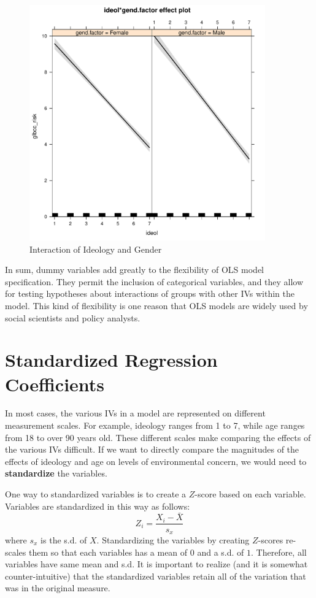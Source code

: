 \documentclass[11pt,openany]{book}\usepackage[]{graphicx}\usepackage[]{color}
\begin{document}
\begin{figure}
  \centering
  \includegraphics[width=4in]{14_Topics/dummales.pdf}%
  \caption {Interaction of Ideology and Gender \label{fig:dummales}}
\end{figure}


In sum, dummy variables add greatly to the flexibility of OLS model specification. They permit the inclusion of categorical variables, and they allow for testing hypotheses about interactions  of groups with other IVs within the model. This kind of flexibility is one reason that OLS models are widely used by social scientists and policy analysts.

\section{Standardized Regression Coefficients} 

In most cases, the various IVs in a model are represented on different measurement scales. For example, ideology ranges from 1 to 7, while age ranges from 18 to over 90 years old. These different scales make comparing the effects of the various IVs difficult.  If we want to directly compare the magnitudes of the effects of ideology and age on levels of environmental concern, we would need to \textbf{standardize} the variables. 

One way to standardized variables is to create a $Z$-score based on each variable. Variables are standardized in this way as follows:
\begin{equation}
  Z_i = \frac{X_i-\bar{X}}{s_x} 
\end{equation}
\noindent where $s_x$ is the s.d. of $X$. Standardizing the variables by creating $Z$-scores re-scales them so that each variables has a mean of $0$ and a s.d. of $1$. Therefore, all variables have same mean and s.d. It is important to realize (and it is somewhat counter-intuitive) that the standardized variables retain all of the variation that was in the original measure.
\end{document}
